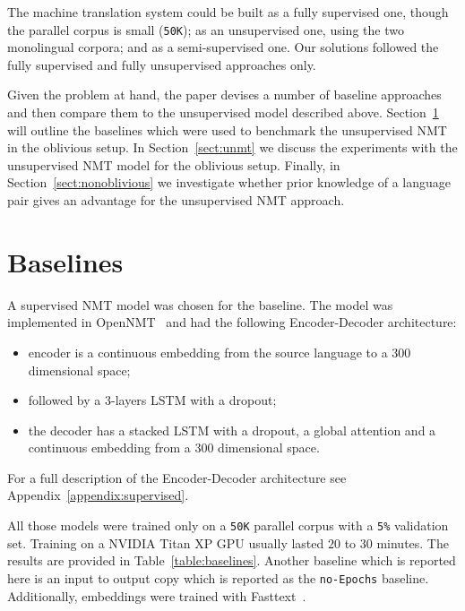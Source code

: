 \documentclass[]{article}
\begin{document}
The machine translation system could be built as a fully supervised one, though the parallel corpus is small ({\tt 50K}); as an unsupervised one, using the two monolingual corpora; and as a semi-supervised one.
Our solutions followed the fully supervised and fully unsupervised approaches only.

Given the problem at hand, the paper devises a number of baseline approaches and then compare them to the unsupervised model described above.
Section~\ref{sect:baselines} will outline the baselines which were used to benchmark the unsupervised NMT in the oblivious setup.
In Section~\ref{sect:unmt} we discuss the experiments with the unsupervised NMT model for the oblivious setup.
Finally, in Section~\ref{sect:nonoblivious} we investigate whether prior knowledge of a language pair gives an advantage for the unsupervised NMT approach.

\section{Baselines}
\label{sect:baselines}

A supervised NMT model was chosen for the baseline.
The model was implemented in OpenNMT~\citep{opennmt} and had the following Encoder-Decoder architecture:
\begin{itemize}
\item encoder is a continuous embedding from the source language to a $300$ dimensional space;
\item followed by a $3$-layers LSTM with a dropout;
\item the decoder has a stacked LSTM with a dropout, a global attention \citep{luong2015effective} and a continuous embedding from a $300$ dimensional space.
\end{itemize}
For a full description of the Encoder-Decoder architecture see Appendix~\ref{appendix:supervised}.

All those models were trained only on a {\tt 50K} parallel corpus with a {\tt 5\%} validation set.
Training on a NVIDIA Titan XP GPU usually lasted $20$ to $30$ minutes.
The results are provided in Table~\ref{table:baselines}.
Another baseline which is reported here is an input to output copy which is reported as the {\tt no-Epochs} baseline.
Additionally, embeddings were trained with Fasttext~\citep{bojanowski2016enriching}.
\end{document}
